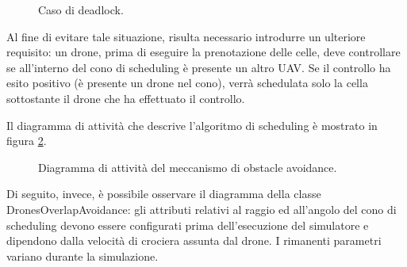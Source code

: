 \begin{enumerate} [label=(\alph*)]
\begin{figure}[H]
\begin{center}
        \end{center}
        \caption{Caso di deadlock.}
        \label{overlapping_c}
    \end{figure}
    Al fine di evitare tale situazione, risulta necessario introdurre un ulteriore requisito: un drone, prima di eseguire la prenotazione delle celle, deve controllare se all'interno del cono di scheduling è presente un altro UAV.
    Se il controllo ha esito positivo (è presente un drone nel cono), verrà schedulata solo la cella sottostante il drone che ha effettuato il controllo.
\end{enumerate}

Il diagramma di attività che descrive l'algoritmo di scheduling è mostrato in figura \ref{activity_scheduling}.

\begin{figure}[H] 
    \captionsetup{justification=centering, margin=2cm, font=footnotesize}
    \begin{center}
    \end{center}
    \caption{Diagramma di attività del meccanismo di obstacle avoidance.}
    \label{activity_scheduling}
\end{figure}

Di seguito, invece, è possibile osservare il diagramma della classe DronesOverlapAvoidance: gli attributi relativi al raggio ed all'angolo del cono di scheduling devono essere configurati prima dell'esecuzione del simulatore e dipendono dalla velocità di crociera assunta dal drone.
I rimanenti parametri variano durante la simulazione.

